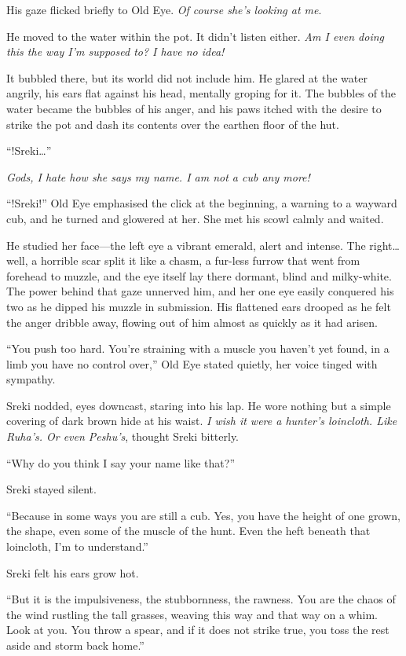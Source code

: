 His gaze flicked briefly to Old Eye. \emph{Of course she's looking at me}.

He moved to the water within the pot. It didn't listen either. \emph{Am I even doing this the way I'm supposed to? I have no idea!}

It bubbled there, but its world did not include him. He glared at the water angrily, his ears flat against his head, mentally groping for it. The bubbles of the water became the bubbles of his anger, and his paws itched with the desire to strike the pot and dash its contents over the earthen floor of the hut.

``!Sreki\ldots''

\emph{Gods, I hate how she says my name. I am not a cub any more!}

``!Sreki!'' Old Eye emphasised the click at the beginning, a warning to a wayward cub, and he turned and glowered at her. She met his scowl calmly and waited.

He studied her face---the left eye a vibrant emerald, alert and intense. The right\ldots{} well, a horrible scar split it like a chasm, a fur-less furrow that went from forehead to muzzle, and the eye itself lay there dormant, blind and milky-white. The power behind that gaze unnerved him, and her one eye easily conquered his two as he dipped his muzzle in submission. His flattened ears drooped as he felt the anger dribble away, flowing out of him almost as quickly as it had arisen.

``You push too hard. You're straining with a muscle you haven't yet found, in a limb you have no control over,'' Old Eye stated quietly, her voice tinged with sympathy.

Sreki nodded, eyes downcast, staring into his lap. He wore nothing but a simple covering of dark brown hide at his waist. \emph{I wish it were a hunter's loincloth. Like Ruha's. Or even Peshu's}, thought Sreki bitterly.

``Why do you think I say your name like that?''

Sreki stayed silent.

``Because in some ways you are still a cub. Yes, you have the height of one grown, the shape, even some of the muscle of the hunt. Even the heft beneath that loincloth, I'm to understand.''

Sreki felt his ears grow hot.

``But it is the impulsiveness, the stubbornness, the rawness. You are the chaos of the wind rustling the tall grasses, weaving this way and that way on a whim. Look at you. You throw a spear, and if it does not strike true, you toss the rest aside and storm back home.''

